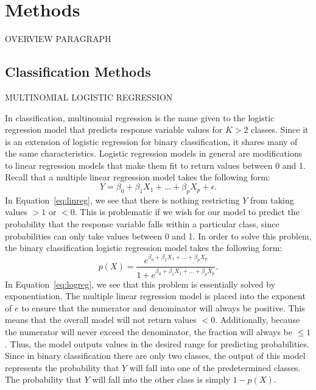\documentclass[12pt]{article}
\begin{document}
\section{Methods}
\label{sec:meth}

OVERVIEW PARAGRAPH

\subsection{Classification Methods}
\label{sec:class}

MULTINOMIAL LOGISTIC REGRESSION

In classification, multinomial regression is the name given to the 
logistic regression model that predicts response variable values for 
$K > 2$ classes.  Since it is an extension of logistic regression for 
binary classification, it shares many of the same characteristics.  
Logistic regression models in general are modifications to linear 
regression models that make them fit to return values between 0 and 1.  
Recall that a multiple linear regression model takes the following form:
\begin{equation}
  \label{eq:linreg}
  Y = \beta_0 + \beta_1X_1 + ... + \beta_pX_p + \epsilon.
\end{equation}
In Equation~\eqref{eq:linreg}, we see that there is nothing restricting 
$Y$ from taking values $> 1$ or $< 0$.  This is problematic if we wish 
for our model to predict the probability that the response variable 
falls within a particular class, since probabilities can only take 
values between 0 and 1.  In order to solve this problem, the binary 
classification logistic regression model takes the following form:
\begin{equation}
  \label{eq:logreg}
  p(X) = 
  \frac{e ^ {\beta_0 + \beta_1X_1 + ... + \beta_pX_p}} 
  {1 + e ^ {\beta_0 + \beta_1X_1 + ... + \beta_pX_p}}.
\end{equation}
In Equation~\eqref{eq:logreg}, we see that this problem is essentially 
solved by exponentiation.  The multiple linear regression model is 
placed into the exponent of $e$ to ensure that the numerator and 
denominator will always be positive.  This means that the overall 
model will not return values $< 0$.  Additionally, because the numerator 
will never exceed the denominator, the fraction will always be $\leq 1$.  
Thus, the model outputs values in the desired range for predicting probabilities. 
 Since in binary classification there are only two classes, the output of 
 this model represents the probability that $Y$ will fall into one of the 
 predetermined classes.  The probability that $Y$ will fall into the other 
 class is simply $1 - p(X)$.
\end{document}
